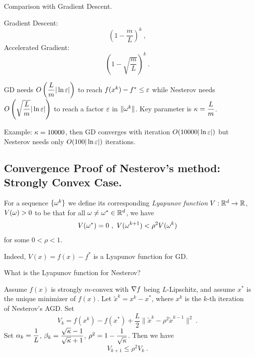 Comparison with Gradient Descent.

Gradient Descent:
$$(1-\frac{m}{L})^k \ ,$$
Accelerated Gradient: $$(1-\sqrt{\frac{m}{L}})^k \ .$$

GD needs $O\left(\dfrac{L}{m}|\ln \varepsilon|\right)$
to reach $f(x^k)-f^*\leq \varepsilon$ while Nesterov needs $O\left(\sqrt{\dfrac{L}{m}}|\ln \varepsilon|\right)$
to reach a factor $\varepsilon$ in $\|\omega^k\|$. Key parameter is $\kappa=\dfrac{L}{m}$.

Example: $\kappa = 10000$, then GD converges with iteration $O(10000|\ln\varepsilon|)$ but Nesterov needs only $O(100|\ln \varepsilon|)$ iterations.

\subsection{Convergence Proof of Nesterov's method: Strongly Convex Case.}

\begin{definition}\label{Def:Lyapunov}
For a sequence $\{\omega^k\}$ we define its corresponding \emph{Lyapunov function} $V: \mathbb R^d\rightarrow \mathbb R$, $V(\omega)>0$ to be that for all $\omega\neq \omega^*\in \mathbb R^d$, we have 
$$V(\omega^*)=0 \ , \  V(\omega^{k+1})<\rho^2 V(\omega^k) $$
for some $0<\rho<1$.
\end{definition}

Indeed, $V(x)=f(x)-f^*$ is a Lyapunov function for GD.

What is the Lyapunov function for Nesterov?


\begin{theorem}\label{Thm:NesterovConvergence:StronglyConvex} 
Assume $f(x)$ is strongly $m$-convex with $\nabla f$ being $L$-Lipschitz, and assume $x^*$ is the unique minimizer of $f(x)$. Let $\widetilde{x}^k=x^k-x^*$, where $x^k$ is the $k$-th iteration of Nesterov's AGD. Set
$$V_k=f(x^k)-f(x^*)+\dfrac{L}{2}\|\widetilde{x}^k-\rho^2 \widetilde{x}^{k-1}\|^2 \ .$$ Set $\alpha_k=\dfrac{1}{L}$, $\beta_k=\dfrac{\sqrt{\kappa}-1}{\sqrt{\kappa}+1}$, 
$\rho^2=1-\dfrac{1}{\sqrt{\kappa}}$. Then we have \begin{equation}\label{Thm:NesterovConvergence:StronglyConvex:Eq:LyapunovIterativeEstimate}
V_{k+1}\leq \rho^2 V_k \ .
\end{equation}
\end{theorem}

